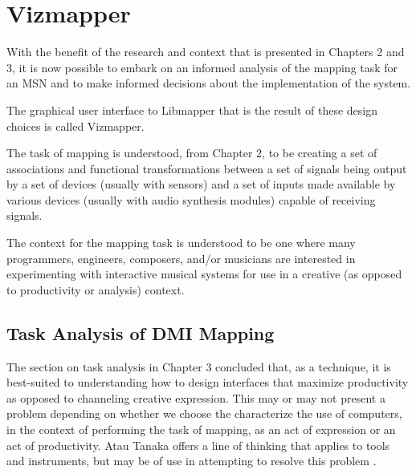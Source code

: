 \resetdatestamp

\chapter{Vizmapper}

With the benefit of the research and context that is presented in Chapters 2 and 3, it is now possible to embark on an informed analysis of the mapping task for an MSN and to make informed decisions about the implementation of the system.

The graphical user interface to Libmapper that is the result of these design choices is called Vizmapper.

The task of mapping is understood, from Chapter 2, to be creating a set of associations and functional transformations between a set of signals being output by a set of devices (usually with sensors) and a set of inputs made available by various devices (usually with audio synthesis modules)  capable of receiving signals.

The context for the mapping task is understood to be one where many programmers, engineers, composers, and/or musicians are interested in experimenting with interactive musical systems for use in a creative (as opposed to productivity or analysis) context.

\section{Task Analysis of DMI Mapping}

The section on task analysis in Chapter 3 concluded that, as a technique, it is best-suited to understanding how to design interfaces that maximize productivity as opposed to channeling creative expression. This may or may not present a problem depending on whether we choose the characterize the use of computers, in the context of performing the task of mapping, as an act of expression or an act of productivity. Atau Tanaka offers a line of thinking that applies to tools and instruments, but may be of use in attempting to resolve this problem \cite{tanaka2000}.

